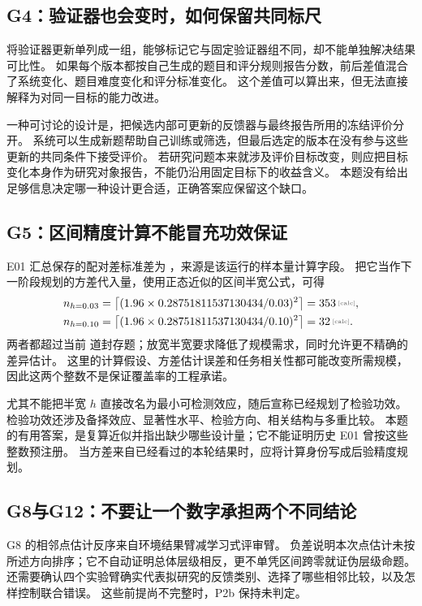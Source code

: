 \subsection{G4：验证器也会变时，如何保留共同标尺}\label{sol:g04}

将验证器更新单列成一组，能够标记它与固定验证器组不同，却不能单独解决结果可比性。
如果每个版本都按自己生成的题目和评分规则报告分数，前后差值混合了系统变化、题目难度变化和评分标准变化。
这个差值可以算出来，但无法直接解释为对同一目标的能力改进。

一种可讨论的设计是，把候选内部可更新的反馈器与最终报告所用的冻结评价分开。
系统可以生成新题帮助自己训练或筛选，但最后选定的版本在没有参与这些更新的共同条件下接受评价。
若研究问题本来就涉及评价目标改变，则应把目标变化本身作为研究对象报告，不能仍沿用固定目标下的收益含义。
本题没有给出足够信息决定哪一种设计更合适，正确答案应保留这个缺口。

\subsection{G5：区间精度计算不能冒充功效保证}\label{sol:g05}

E01 汇总保存的配对差标准差为 ，来源是该运行的样本量计算字段。
把它当作下一阶段规划的方差代入量，使用正态近似的区间半宽公式，可得
\begin{align}
n_{h=0.03}&=\left\lceil(1.96\times0.28751811537130434/0.03)^2\right\rceil
 =\calcnum{353},\\
n_{h=0.10}&=\left\lceil(1.96\times0.28751811537130434/0.10)^2\right\rceil
 =\calcnum{32}.
\end{align}
两者都超过当前  道封存题；放宽半宽要求降低了规模需求，同时允许更不精确的差异估计。
这里的计算假设、方差估计误差和任务相关性都可能改变所需规模，因此这两个整数不是保证覆盖率的工程承诺。

尤其不能把半宽 $h$ 直接改名为最小可检测效应，随后宣称已经规划了检验功效。
检验功效还涉及备择效应、显著性水平、检验方向、相关结构与多重比较。
本题的有用答案，是复算近似并指出缺少哪些设计量；它不能证明历史 E01 曾按这些整数预注册。
当方差来自已经看过的本轮结果时，应将计算身份写成后验精度规划。

\subsection{G8与G12：不要让一个数字承担两个不同结论}\label{sol:g08}

G8 的相邻点估计反序来自环境结果臂减学习式评审臂。
负差说明本次点估计未按所述方向排序；它不自动证明总体层级相反，更不单凭区间跨零就证伪层级命题。
还需要确认四个实验臂确实代表拟研究的反馈类别、选择了哪些相邻比较，以及怎样控制联合错误。
这些前提尚不完整时，P2b 保持未判定。

